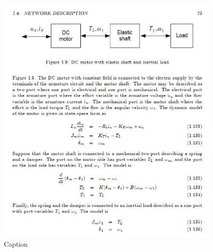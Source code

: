 \begin{figure}[H]
    \centering
    \includegraphics{figures/model_network_equations.PNG}
    \caption{Caption}
    \label{fig:model_network_equations}
\end{figure}